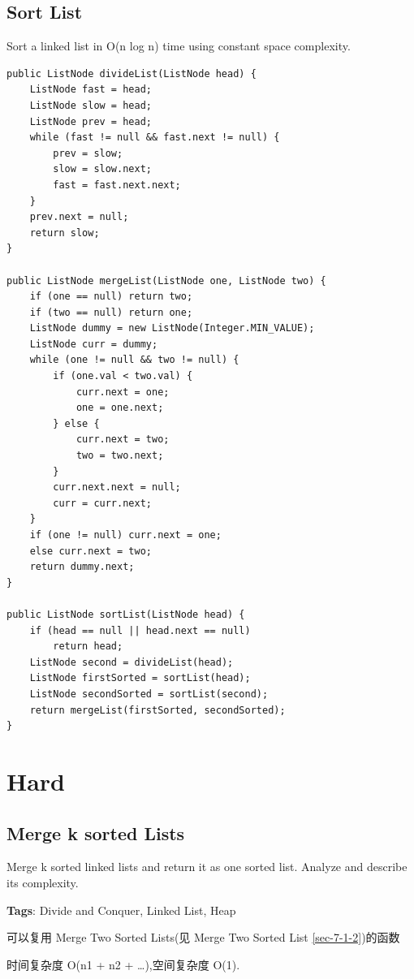 \documentclass[12pt]{book}
\begin{document}
\subsection{Sort List}
\label{sec-7-2-2}
Sort a linked list in O(n log n) time using constant space complexity.

\lstset{language=java,label= ,caption= ,numbers=none}
\begin{lstlisting}
public ListNode divideList(ListNode head) {
    ListNode fast = head;
    ListNode slow = head;
    ListNode prev = head;
    while (fast != null && fast.next != null) {
        prev = slow;
        slow = slow.next;
        fast = fast.next.next;
    }
    prev.next = null;
    return slow;
}
        
public ListNode mergeList(ListNode one, ListNode two) {
    if (one == null) return two;
    if (two == null) return one;
    ListNode dummy = new ListNode(Integer.MIN_VALUE);
    ListNode curr = dummy;
    while (one != null && two != null) {
        if (one.val < two.val) {
            curr.next = one;
            one = one.next;
        } else {
            curr.next = two;
            two = two.next;
        }
        curr.next.next = null;
        curr = curr.next;
    }
    if (one != null) curr.next = one;
    else curr.next = two;
    return dummy.next;
}
        
public ListNode sortList(ListNode head) {
    if (head == null || head.next == null) 
        return head;
    ListNode second = divideList(head);
    ListNode firstSorted = sortList(head);
    ListNode secondSorted = sortList(second);
    return mergeList(firstSorted, secondSorted);
}
\end{lstlisting}

\section{Hard}
\label{sec-7-3}
\subsection{Merge k sorted Lists}
\label{sec-7-3-1}
Merge k sorted linked lists and return it as one sorted list. Analyze and describe its complexity.

\textbf{Tags}: Divide and Conquer, Linked List, Heap

可以复用 Merge Two Sorted Lists(见 Merge Two Sorted List \ref{sec-7-1-2})的函数

时间复杂度 O(n1 + n2 + \ldots{}),空间复杂度 O(1). 
\end{document}
